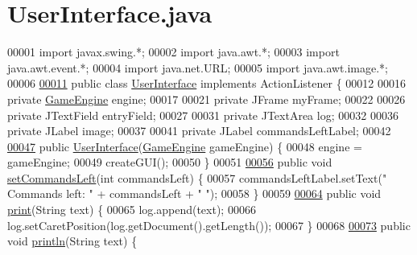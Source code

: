 \hypertarget{UserInterface_8java_source}{\section{User\-Interface.\-java}
}

\begin{DoxyCode}
00001 \textcolor{keyword}{import} javax.swing.*;
00002 \textcolor{keyword}{import} java.awt.*;
00003 \textcolor{keyword}{import} java.awt.event.*;
00004 \textcolor{keyword}{import} java.net.URL;
00005 \textcolor{keyword}{import} java.awt.image.*;
00006 
\hypertarget{UserInterface_8java_source_l00011}{}\hyperlink{classUserInterface}{00011} \textcolor{keyword}{public} \textcolor{keyword}{class }\hyperlink{classUserInterface}{UserInterface} \textcolor{keyword}{implements} ActionListener \{
00012 
00016     \textcolor{keyword}{private} \hyperlink{classGameEngine}{GameEngine} engine;
00017 
00021     \textcolor{keyword}{private} JFrame myFrame;
00022 
00026     \textcolor{keyword}{private} JTextField entryField;
00027 
00031     \textcolor{keyword}{private} JTextArea log;
00032 
00036     \textcolor{keyword}{private} JLabel image;
00037 
00041     \textcolor{keyword}{private} JLabel commandsLeftLabel;
00042 
\hypertarget{UserInterface_8java_source_l00047}{}\hyperlink{classUserInterface_a3afe416f3ee335fec8bc815d382c3874}{00047}     \textcolor{keyword}{public} \hyperlink{classUserInterface_a3afe416f3ee335fec8bc815d382c3874}{UserInterface}(\hyperlink{classGameEngine}{GameEngine} gameEngine) \{
00048         engine = gameEngine;
00049         createGUI();
00050     \}
00051 
\hypertarget{UserInterface_8java_source_l00056}{}\hyperlink{classUserInterface_ad12f31e49e7ed0904bc51ad330e55147}{00056}     \textcolor{keyword}{public} \textcolor{keywordtype}{void} \hyperlink{classUserInterface_ad12f31e49e7ed0904bc51ad330e55147}{setCommandsLeft}(\textcolor{keywordtype}{int} commandsLeft) \{
00057         commandsLeftLabel.setText(\textcolor{stringliteral}{" Commands left: "} + commandsLeft + \textcolor{stringliteral}{"  "});
00058     \}
00059 
\hypertarget{UserInterface_8java_source_l00064}{}\hyperlink{classUserInterface_a7a0de5ce2b0e0d25ba6573e87c63c1de}{00064}     \textcolor{keyword}{public} \textcolor{keywordtype}{void} \hyperlink{classUserInterface_a7a0de5ce2b0e0d25ba6573e87c63c1de}{print}(String text) \{
00065         log.append(text);
00066         log.setCaretPosition(log.getDocument().getLength());
00067     \}
00068 
\hypertarget{UserInterface_8java_source_l00073}{}\hyperlink{classUserInterface_a79f606b4b1f5d1523e50eea00039ed94}{00073}     \textcolor{keyword}{public} \textcolor{keywordtype}{void} \hyperlink{classUserInterface_a79f606b4b1f5d1523e50eea00039ed94}{println}(String text) \{

\end{DoxyCode}
